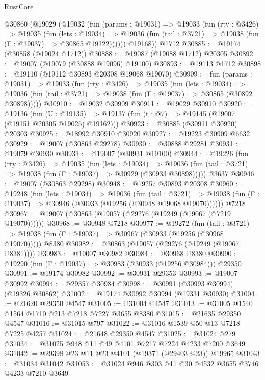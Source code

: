 \begin{lexlean}{RustCore}
\begin{coremodule}
    @30860
      (@19029
        (@19032
          (fun (params : @19031) =>
          @19033
            (fun (rty : @3426) =>
            @19035
              (fun (lets : @19034) =>
              @19036 (fun (tail : @3721) => @19038 (fun (Γ : @19037) => @30865 @19122))))))
        @19168))
    @1712
@30885 := @19174 (@30858 (@19024 @1712))
@30888 := @19087 (@19088 @1712) @20305
@30892 := @19007 (@19079 (@30888 @19096) @19100)
@30893 := @19113 @1712
@30898 := @19110 (@19112 @30893 @20308 @19068 @19070)
@30909 := fun (params : @19031) =>
  @19033
    (fun (rty : @3426) =>
    @19035
      (fun (lets : @19034) =>
      @19036 (fun (tail : @3721) => @19038 (fun (Γ : @19037) => @30865 (@30892 @30898)))))
@30910 := @19032 @30909
@30911 := @19029 @30910
@30920 := @19136
    (fun (U : @19135) => @19137 (fun (t : @7) => @19145 (@19007 (@19151 @20305 @19025) @19162)))
@30923 := @30885 (@30911 @30920) @20303
@30925 := @18992 @30910 @30920
@30927 := @19223 @30909 @6632
@30929 := @19007 (@30863 @29278)
@30930 := @30888 @29281
@30931 := @19079 @30930
@30933 := @19007 (@30931 @19100)
@30944 := @19226
    (fun (rty : @3426) =>
    @19035
      (fun (lets : @19034) =>
      @19036 (fun (tail : @3721) => @19038 (fun (Γ : @19037) => @30929 (@30933 @30898)))))
    @3637
@30946 := @19007 (@30863 @29298)
@30948 := @19257 @30893 @20308
@30960 := @19248
    (fun (lets : @19034) =>
    @19036
      (fun (tail : @3721) =>
      @19038 (fun (Γ : @19037) => @30946 (@30933 (@19256 (@30948 @19068 @19070))))))
    @7218
@30967 := @19007 (@30863 (@19057 (@29276 (@19249 (@19067 (@7219 @19070))))))
@30968 := @30948 @7218
@30977 := @19272
    (fun (tail : @3721) => @19038 (fun (Γ : @19037) => @30967 (@30933 (@19256 (@30968 @19070)))))
    @8380
@30982 := @30863 (@19057 (@29276 (@19249 (@19067 @8381))))
@30983 := @19007 @30982
@30984 := @30968 @8380
@30990 := @19290 (fun (Γ : @19037) => @30983 (@30933 (@19256 @30984))) @29350
@30991 := @19174 @30982
@30992 := @30931 @29353
@30993 := @19007 @30992
@30994 := @29357 @30984
@30998 := @30991 (@30993 @30994) (@19326 @30862)
@31002 := @19174 @30992 @30994 (@19331 @30930)
@31004 := @21620 @29350 @4547
@31005 := @31004 @4547
@31013 := @31005 @1540 @1564 @1710 @213 @7218 @7227 @3655 @8380
@31015 := @21635 @29350 @4547
@31016 := @31015 @797
@31022 := @31016 @1539 @50 @13 @7218 @7225 @4257
@31024 := @21648 @29350 @4547
@31025 := @31024 @279
@31034 := @31025 @948 @11 @49 @4101 @7217 @7224 @4233 @7200 @3649
@31042 := @29398 @23 @11 @23 @4101 (@19371 (@29403 @23)) @19965
@31043 := @31034 @31042
@31053 := @31024 @946 @303 @11 @30 @4532 @3655 @3746 @4233 @7210 @3649

\end{coremodule}
\end{lexlean}
